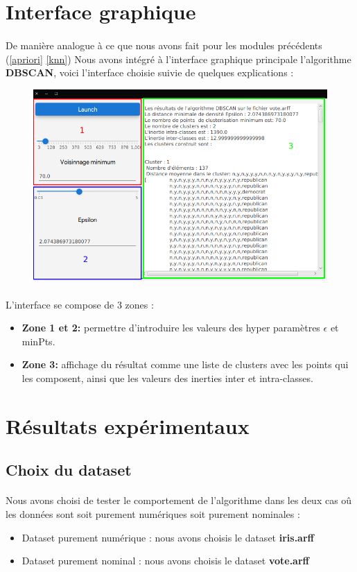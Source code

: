\begin{itemize}
		\end{itemize}
\section{Interface graphique}
	\paragraph{}
	De manière analogue à ce que nous avons fait pour les modules précédents (\ref{apriori} \ref{knn}) Nous avons intégré à l'interface graphique principale l'algorithme \textbf{DBSCAN}, voici l'interface choisie suivie de quelques explications : 
	\begin{figure}[H]
		\centering
		\includegraphics[width=0.75\linewidth]{dbscan/images/app.png}
	\end{figure}
	\paragraph{}
	L'interface se compose de 3 zones :
	\begin{itemize}
		\item \textbf{Zone 1 et 2:} permettre d'introduire les valeurs des hyper paramètres $\epsilon$ et minPts.
		\item \textbf{Zone 3:} affichage du résultat comme une liste de clusters avec les points qui les composent, ainsi que les valeurs des inerties inter et intra-classes.
	\end{itemize}
\section{Résultats expérimentaux}
	\subsection{Choix du dataset}
		\paragraph{}Nous avons choisi de tester le comportement de l'algorithme dans les deux cas oû les données sont soit purement numériques soit purement nominales : 
		\begin{itemize}
			\item Dataset purement numérique : nous avons choisis le dataset \textbf{iris.arff}
			\item Dataset purement nominal : nous avons choisis le dataset \textbf{vote.arff}
		\end{itemize}
